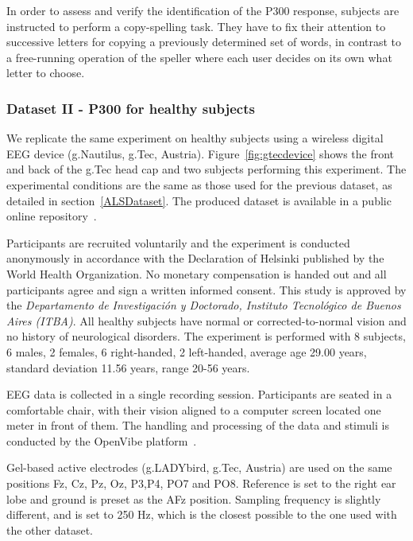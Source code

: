 In order to assess and verify the identification of the P300 response, subjects are instructed to perform a copy-spelling task. They have to fix their attention to successive letters for copying a previously determined set of words, in contrast to a free-running operation of the speller where each user decides on its own what letter to choose.

\subsubsection{Dataset II - P300 for healthy subjects}
\label{P300healthysubject}

We replicate the same experiment on healthy subjects using a wireless digital EEG device (g.Nautilus, g.Tec, Austria).  Figure~\ref{fig:gtecdevice} shows the front and back of the g.Tec head cap and two subjects performing this experiment.   The experimental conditions are the same as those used for the previous dataset, as detailed in section~\ref{ALSDataset}.  The produced dataset is available in a public online repository~\cite{owndataset}.

Participants are recruited voluntarily and the experiment is conducted anonymously in accordance with the Declaration of Helsinki published by the World Health Organization.  No monetary compensation is handed out and all participants agree and sign a written informed consent.  This study is approved by the \textit{Departamento de Investigación y Doctorado, Instituto Tecnológico de Buenos Aires (ITBA)}.  All healthy subjects have normal or corrected-to-normal vision and no history of neurological disorders. The experiment is performed with 8 subjects, 6 males, 2 females, 6 right-handed, 2 left-handed, average age 29.00 years, standard deviation  11.56 years, range 20-56 years.

EEG data is collected in a single recording session. Participants are seated in a comfortable chair, with their vision aligned to a computer screen located one meter in front of them.  The handling and processing of the data and stimuli is conducted by the OpenVibe platform~\cite{Renard2010}. 

Gel-based active electrodes (g.LADYbird, g.Tec, Austria) are used on the same positions Fz, Cz, Pz, Oz, P3,P4, PO7 and PO8.  Reference is set to the right ear lobe and ground is preset as the AFz position.   Sampling frequency is slightly different, and is set to 250 Hz, which is the closest possible to the one used with the other dataset.


